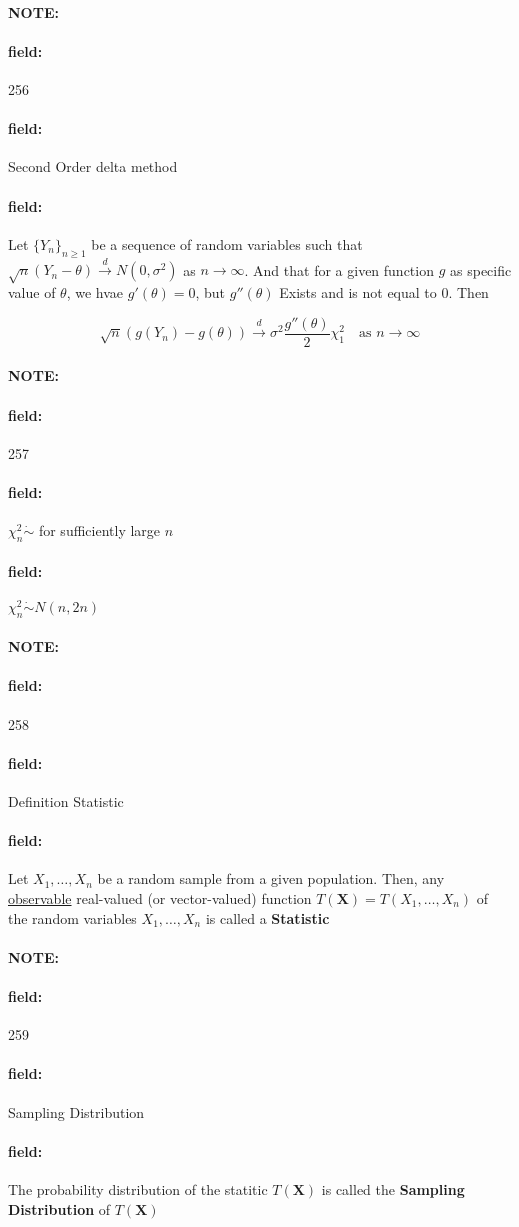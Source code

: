 \documentclass[12pt]{article}
\newenvironment{note}{\paragraph{NOTE:}}{}
\newenvironment{field}{\paragraph{field:}}{}
\begin{document}
\begin{note} \begin{field} \tiny 256 \end{field}
  \begin{field}
    Second Order delta method
  \end{field}
  \begin{field}
    Let $\{Y_n\}_{n \geq 1}$ be a sequence of random variables such that $\sqrt{n}(Y_n - \theta ) \overset{d}{\to} N(0,\sigma^2)$ as $n\to \infty$.
    And that for a given function $g$ as specific value of $\theta$, we hvae $g'(\theta)=0$, but $g''(\theta)$ Exists and is not equal to 0. Then

    $$\sqrt{n}(g(Y_n) - g(\theta)) \overset{d}{\to} \sigma^2 \frac{g''(\theta)}{2}\chi^2_1 \quad \text{as } n \to \infty$$

  \end{field}
\end{note}

\begin{note} \begin{field} \tiny 257 \end{field}
  \begin{field}
    $\chi_n^2 \dot{\sim} $ for sufficiently large $n$
  \end{field}
  \begin{field}
    $\chi_n^2 \dot{\sim} N(n,2n)$
  \end{field}
\end{note}

\begin{note} \begin{field} \tiny 258 \end{field}
  \begin{field}
    Definition Statistic
  \end{field}
  \begin{field}
    Let $X_1, \ldots, X_n$ be a random sample from a given population. Then, any \underline{observable} real-valued (or vector-valued) function $T(\mathbf{X}) = T(X_1, \ldots, X_n)$ of the random variables $X_1, \ldots, X_n$ is called a \textbf{Statistic}
  \end{field}
\end{note}

\begin{note} \begin{field} \tiny 259 \end{field}
  \begin{field}
    Sampling Distribution
  \end{field}
  \begin{field}
    The probability distribution of the statitic $T(\mathbf{X})$ is called the \textbf{Sampling Distribution} of $T(\mathbf{X})$
  \end{field}
\end{note}
\end{document}
